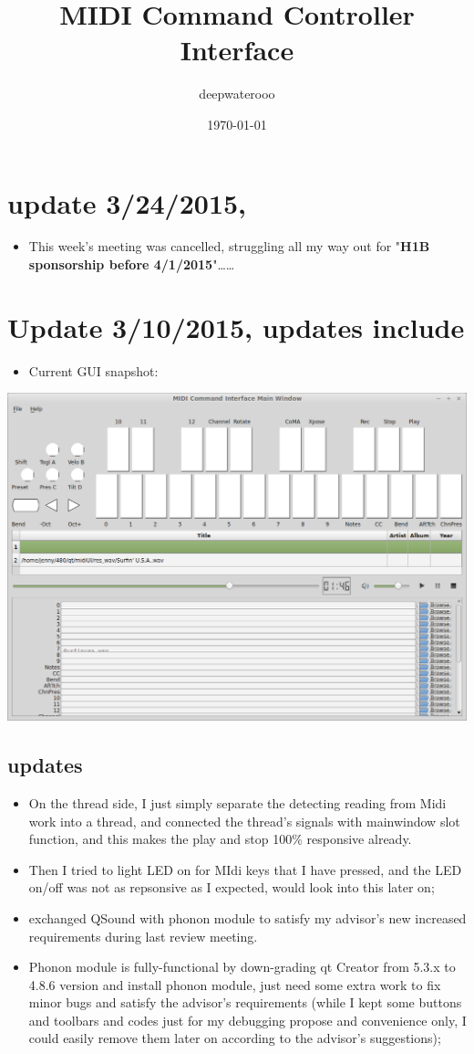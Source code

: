 \documentclass[9pt,b5paper]{article}
\author{deepwaterooo}
\date{\today}
\title{MIDI Command Controller Interface}
\begin{document}
\maketitle
\tableofcontents

\section{update 3/24/2015,}
\label{sec-1}
\begin{itemize}
\item This week's meeting was cancelled, struggling all my way out for "\textbf{H1B sponsorship before 4/1/2015}"\ldots{}\ldots{}
\end{itemize}
\section{Update 3/10/2015, updates include}
\label{sec-2}
\begin{itemize}
\item Current GUI snapshot:
\end{itemize}

\includegraphics[width=.9\linewidth]{./pic/Screenshot_from_2015-03-08_13:31:00.png}
\subsection{updates}
\label{sec-2-1}
\begin{itemize}
\item On the thread side, I just simply separate the detecting reading from Midi work into a thread, and connected the thread's signals with mainwindow slot function, and this makes the play and stop 100\% responsive already.
\item Then I tried to light LED on for MIdi keys that I have pressed, and the LED on/off was not as repsonsive as I expected, would look into this later on;
\item exchanged QSound with phonon module to satisfy my advisor's new increased requirements during last review meeting.
\item Phonon module is fully-functional by down-grading qt Creator from 5.3.x to 4.8.6 version and install phonon module, just need some extra work to fix minor bugs and satisfy the advisor's requirements (while I kept some buttons and toolbars and codes just for my debugging propose and convenience only, I could easily remove them later on according to the advisor's suggestions);
\end{itemize}
\end{document}
